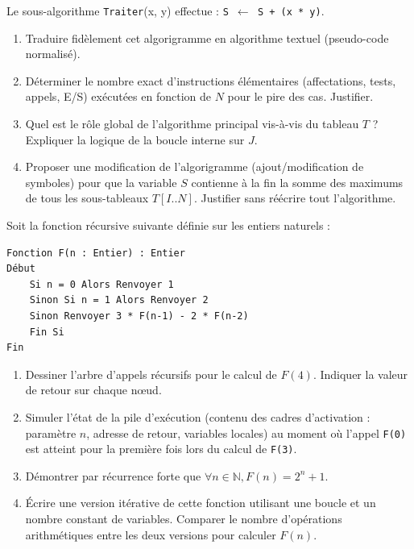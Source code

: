\documentclass[11pt]{article}
\begin{document}
\begin{exercice}
Le sous-algorithme \texttt{Traiter}(x, y) effectue : \texttt{S $\leftarrow$ S + (x * y)}.
\begin{enumerate}
    \item Traduire fidèlement cet algorigramme en algorithme textuel (pseudo-code normalisé).
    \item Déterminer le nombre exact d'instructions élémentaires (affectations, tests, appels, E/S) exécutées en fonction de $N$ pour le pire des cas. Justifier.
    \item Quel est le rôle global de l'algorithme principal vis-à-vis du tableau $T$ ? Expliquer la logique de la boucle interne sur $J$.
    \item Proposer une modification de l'algorigramme (ajout/modification de symboles) pour que la variable $S$ contienne à la fin la somme des maximums de tous les sous-tableaux $T[I..N]$. Justifier sans réécrire tout l'algorithme.
\end{enumerate}
\end{exercice}

\begin{exercice}
Soit la fonction récursive suivante définie sur les entiers naturels :
\begin{verbatim}
Fonction F(n : Entier) : Entier
Début
    Si n = 0 Alors Renvoyer 1
    Sinon Si n = 1 Alors Renvoyer 2
    Sinon Renvoyer 3 * F(n-1) - 2 * F(n-2)
    Fin Si
Fin
\end{verbatim}
\begin{enumerate}
    \item Dessiner l'arbre d'appels récursifs pour le calcul de $F(4)$. Indiquer la valeur de retour sur chaque nœud.
    \item Simuler l'état de la pile d'exécution (contenu des cadres d'activation : paramètre $n$, adresse de retour, variables locales) au moment où l'appel \texttt{F(0)} est atteint pour la première fois lors du calcul de \texttt{F(3)}.
    \item Démontrer par récurrence forte que $\forall n \in \mathbb{N}, F(n) = 2^n + 1$.
    \item Écrire une version itérative de cette fonction utilisant une boucle et un nombre constant de variables. Comparer le nombre d'opérations arithmétiques entre les deux versions pour calculer $F(n)$.
\end{enumerate}
\end{exercice}
\end{document}
